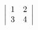 \newenvironment{determinante}[1]{
    \ensuremath\left|\begin{array}{#1}}{
    \end{array}\right|}
\[
    \begin{determinante}{ll}
        1 & 2 \\ 3 & 4
    \end{determinante}
\]

